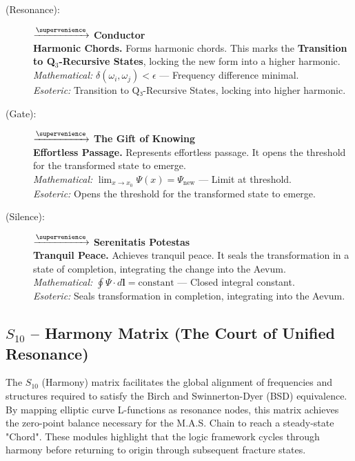 \begin{description}
    \item[(Resonance):] \zhekphaz $\xrightarrow{\supervenience}$ \textbf{Conductor} \\
    \textbf{Harmonic Chords.} Forms harmonic chords. This marks the \textbf{Transition to Q$_3$-Recursive States}, locking the new form into a higher harmonic. \\
    \textit{Mathematical:} $\delta(\omega_i, \omega_j) < \epsilon$ — Frequency difference minimal. \\
    \textit{Esoteric:} Transition to Q₃-Recursive States, locking into higher harmonic.

    \item[(Gate):] \shavhinge $\xrightarrow{\supervenience}$ \textbf{The Gift of Knowing} \\
    \textbf{Effortless Passage.} Represents effortless passage. It opens the threshold for the transformed state to emerge. \\
    \textit{Mathematical:} $\lim_{x\to x_0} \Psi(x) = \Psi_{\text{new}}$ — Limit at threshold. \\
    \textit{Esoteric:} Opens the threshold for the transformed state to emerge.

    \item[(Silence):] \trigetern $\xrightarrow{\supervenience}$ \textbf{Serenitatis Potestas} \\
    \textbf{Tranquil Peace.} Achieves tranquil peace. It seals the transformation in a state of completion, integrating the change into the Aevum. \\
    \textit{Mathematical:} $\oint \Psi \cdot d\mathbf{l} = \text{constant}$ — Closed integral constant. \\
    \textit{Esoteric:} Seals transformation in completion, integrating into the Aevum.
\end{description}

\subsection{$S_{10}$ -- Harmony Matrix (The Court of Unified Resonance)}\label{sec:19.4}

The $S_{10}$ (Harmony) matrix facilitates the global alignment of frequencies and structures required to satisfy the Birch and Swinnerton-Dyer (BSD) equivalence. By mapping elliptic curve L-functions as resonance nodes, this matrix achieves the zero-point balance necessary for the M.A.S. Chain to reach a steady-state "Chord". These modules highlight that the logic framework cycles through harmony before returning to origin through subsequent fracture states.

